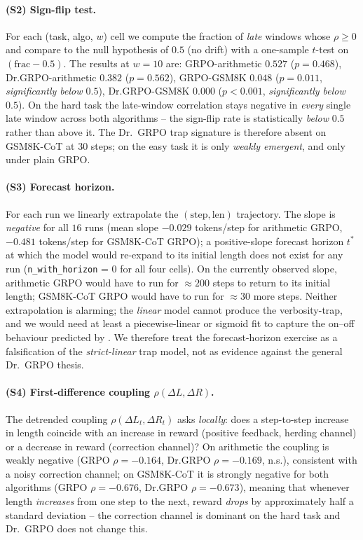 \paragraph{(S2) Sign-flip test.}
For each (task, algo, $w$) cell we compute the fraction of
\emph{late} windows whose $\rho \ge 0$ and compare to the null
hypothesis of $0.5$ (no drift) with a one-sample $t$-test on
$(\mathrm{frac} - 0.5)$. The results at $w = 10$ are:
GRPO-arithmetic $0.527$ ($p = 0.468$), Dr.GRPO-arithmetic
$0.382$ ($p = 0.562$), GRPO-GSM8K $0.048$ ($p = 0.011$,
\emph{significantly below $0.5$}), Dr.GRPO-GSM8K $0.000$
($p < 0.001$, \emph{significantly below $0.5$}). On the
hard task the late-window correlation stays negative in
\emph{every} single late window across both algorithms -- the
sign-flip rate is statistically \emph{below} $0.5$ rather than
above it. The Dr.~GRPO trap signature is therefore absent on
GSM8K-CoT at $30$ steps; on the easy task it is only \emph{weakly
emergent}, and only under plain GRPO.

\paragraph{(S3) Forecast horizon.}
For each run we linearly extrapolate the
$(\mathrm{step}, \mathrm{len})$ trajectory. The slope is
\emph{negative} for all $16$ runs (mean slope $-0.029$ tokens/step
for arithmetic GRPO, $-0.481$ tokens/step for GSM8K-CoT GRPO);
a positive-slope forecast horizon $t^*$ at which the model would
re-expand to its initial length does not exist for any run
(\texttt{n\_with\_horizon} = 0 for all four cells). On the
currently observed slope, arithmetic GRPO would have to run for
$\approx 200$ steps to return to its initial length; GSM8K-CoT
GRPO would have to run for $\approx 30$ more steps. Neither
extrapolation is alarming; the \emph{linear} model cannot
produce the verbosity-trap, and we would need at least a
piecewise-linear or sigmoid fit to capture the on--off
behaviour predicted by \cite{tong2025drgrpo}. We therefore
treat the forecast-horizon exercise as a falsification of the
\emph{strict-linear} trap model, not as evidence against the
general Dr.~GRPO thesis.

\paragraph{(S4) First-difference coupling $\rho(\Delta L, \Delta R)$.}
The detrended coupling $\rho(\Delta L_t, \Delta R_t)$ asks
\emph{locally}: does a step-to-step increase in length coincide
with an increase in reward (positive feedback, herding channel)
or a decrease in reward (correction channel)? On arithmetic the
coupling is weakly negative (GRPO $\rho = -0.164$, Dr.GRPO
$\rho = -0.169$, n.s.), consistent with a noisy correction
channel; on GSM8K-CoT it is strongly negative for both
algorithms (GRPO $\rho = -0.676$, Dr.GRPO $\rho = -0.673$),
meaning that whenever length \emph{increases} from one step to
the next, reward \emph{drops} by approximately half a standard
deviation -- the correction channel is dominant on the hard
task and Dr.~GRPO does not change this.

